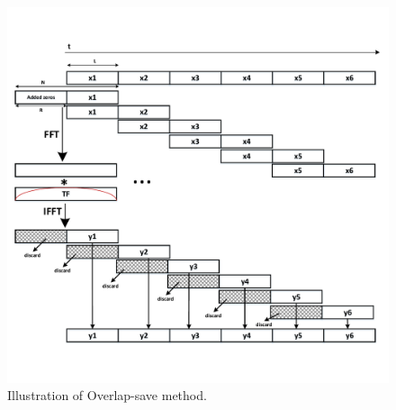 \begin{refsection}
\begin{figure}[h]
	\includegraphics[width=12cm]{./algorithms/overlap_save/figures/overlap-savev2.pdf}
	\caption{Illustration of Overlap-save method.}
	\label{overlapSave}
\end{figure}



\end{refsection}
